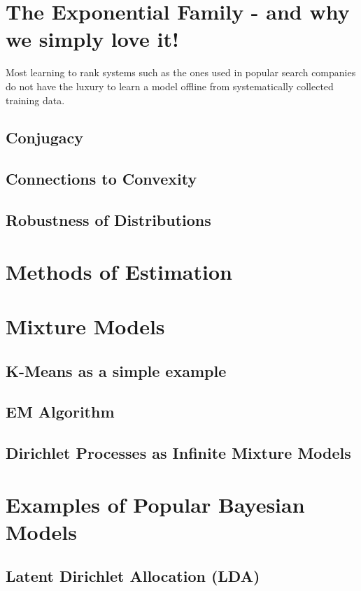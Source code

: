 \documentclass[a4paper]{article}
\begin{document}
\section{The Exponential Family - and why we simply love it!}
\noindent Most learning to rank systems such as the ones used in popular search companies do not have the luxury to learn a model offline from systematically collected training data.



\subsection{Conjugacy}

\subsection{Connections to Convexity}

\subsection{Robustness of Distributions}

\section{Methods of Estimation}

\section{Mixture Models}
\subsection{K-Means as a simple example}
\subsection{EM Algorithm}
\subsection{Dirichlet Processes as Infinite Mixture Models}

\section{Examples of Popular Bayesian Models}
\subsection{Latent Dirichlet Allocation (LDA)}
 


\end{document}
